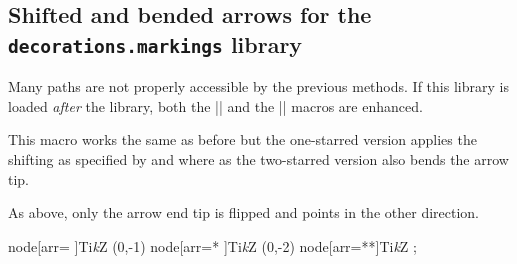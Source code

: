 \begin{multicols}{2}
\subsection{Shifted and bended arrows for the \texttt{decorations.markings} library}
Many paths are not properly accessible by the previous methods.
If this library is loaded \emph{after}
the  library,
both the |\arrow| and the |\arrowreversed| macros are enhanced.

\begin{command}{\arrow{}}
  This macro works the same as before but the one-starred version
  applies the shifting as specified
  by  and 
  where as the two-starred version also bends the arrow tip.
\end{command}
\begin{command}{\arrowreversed{}}
  As above, only the arrow end tip is flipped and points in the other direction.
\end{command}
\begin{codeexample}[width=2cm,preamble=\usetikzlibrary{bending, decorations.markings, ext.arrows-plus}]
\tikz[y=1.5cm, >=Stealth, arrows={[round]}, nodes={circle, draw}]
  \path   node[arr=  ]{Ti\emph kZ} %
   (0,-1) node[arr=* ]{Ti\emph kZ} %
   (0,-2) node[arr=**]{Ti\emph kZ} %
  ;
\end{codeexample}
\end{multicols}
\endinput